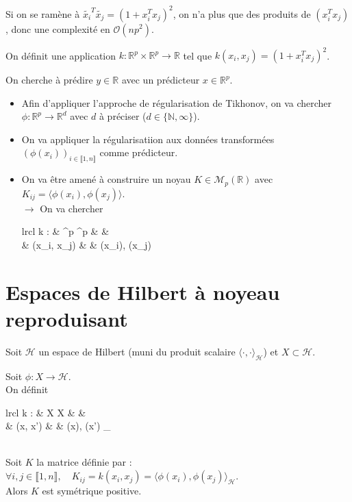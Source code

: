 \documentclass[12pt,a4paper]{article}
\newcommand{\propriete}[2]{%
    \begin{tcolorbox}[colback=white,colframe=green!25!white,title=\textbf{Propriété #1}, coltitle=black]
        #2
    \end{tcolorbox}
}
\newcommand{\important}[1]{%
    \begin{tcolorbox}[colback=red!10!white,colframe=red!30!black]
        #1
    \end{tcolorbox}
}
\begin{document}
Si on se ramène à $\tilde{x_i}^T \tilde{x_j} = (1 + x_i^T x_j)^2$, on n'a plus que des produits de $(x_i^T x_j)$, donc une complexité en $\mathcal{O}(np^2)$. \\

\important{
    On définit une application $k : \mathbb{R}^p \times \mathbb{R}^p \longrightarrow {}$ tel que $k(x_i, x_j) = (1 + x_i^T x_j)^2$.
}

\important{
    On cherche à prédire $y \in \mathbb{R}$ avec un prédicteur $x \in \mathbb{R}^p$.
    \begin{itemize}
        \item Afin d'appliquer l'approche de régularisation de Tikhonov, on va chercher $\phi : \mathbb{R}^p \longrightarrow \mathbb{R}^d$ avec $d$ à préciser ($d \in \{\mathbb{N}, \infty\}$).
        
        \item On va appliquer la régularisatiion aux données transformées $(\phi(x_i))_{i \in \llbracket 1, n \rrbracket}$ comme prédicteur.
        
        \item On va être amené à construire un noyau $K \in \mathcal{M}_p(\mathbb{R})$ avec $K_{ij} = \langle \phi(x_i), \phi(x_j) \rangle$. \\
        $\rightarrow$ On va chercher \begin{array}[t]{lrcl}
            k : & \mathbb{R}^p \times \mathbb{R}^p & \longrightarrow & \mathbb{R} \\
                & (x_i, x_j) & \longmapsto & \langle \phi(x_i), \phi(x_j) \rangle
        \end{array}

    \end{itemize}
}



\section{Espaces de Hilbert à noyeau reproduisant}

Soit $\mathcal{H}$ un espace de Hilbert (muni du produit scalaire $\langle \cdot, \cdot \rangle_{\mathcal{H}}$) et $X \subset {}$. \\


\propriete{}{
    Soit $\phi : X \longrightarrow \mathcal{H}$. \\
    On définit \begin{array}[t]{lrcl}
        k : & X \times X & \longrightarrow & \mathbb{R} \\
            & (x, x') & \longmapsto & \langle \phi(x), \phi(x') \rangle_{\mathcal{H}}
    \end{array} \\

    Soit $K$ la matrice définie par :\\
    $\forall i, j \in \llbracket 1, n \rrbracket, \quad K_{ij} = k(x_i, x_j) = \langle \phi(x_i), \phi(x_j) \rangle_{\mathcal{H}}$. \\

    Alors $K$ est symétrique positive.    
}
\end{document}
